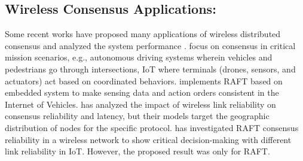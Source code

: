 \subsection{Wireless Consensus Applications: }Some recent works have proposed many applications of wireless distributed consensus and analyzed the system performance \cite{9003220, AsheralievaAlia2020RCFf, SeoHyowoon2018CDDS, KimHyesung2020BOFL, LiuYinqiu2019mALB, WangWenbo2019ASoC, ZhangLei2021HMCR, 10041971}. 
\cite{9003220, 10041971, luo2023symbiotic} focus on consensus in critical mission scenarios, e.g., autonomous driving systems wherein vehicles and pedestrians go through intersections, IoT where terminals (drones, sensors, and actuators) act based on coordinated behaviors. \cite{10000789} implements RAFT based on embedded system to make sensing data and action orders consistent in the Internet of Vehicles. 
\cite{XuHao2020RBWB, SeoHyowoon2021CaCC} 
has analyzed the impact of wireless link reliability on consensus reliability and latency, but their models target the geographic distribution of nodes for the specific protocol.
\cite{9184829,9990047, Li} has investigated RAFT consensus reliability in a wireless network to show critical decision-making with different link reliability in IoT. However, the proposed result was only for RAFT.